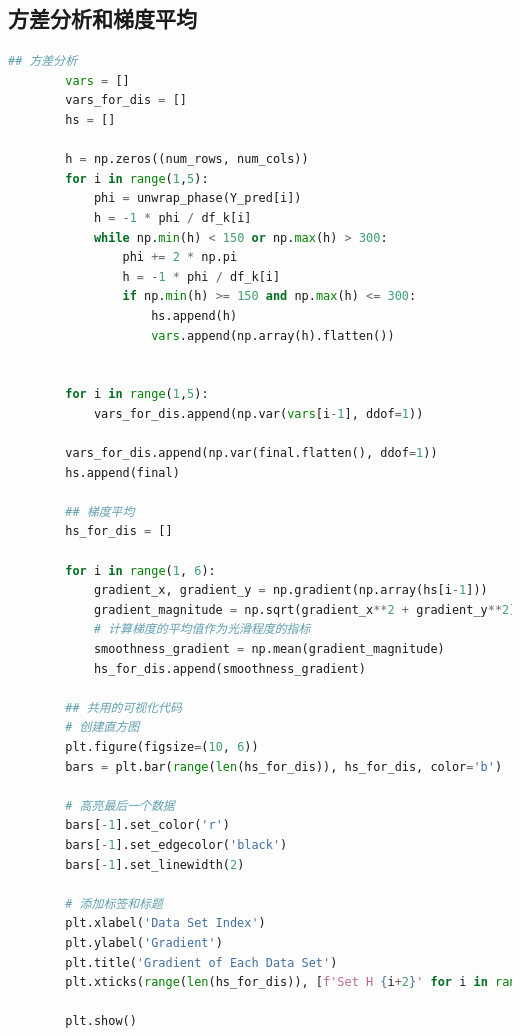 \documentclass[a4paper]{article}
\begin{document}
	\subsection{方差分析和梯度平均}
	\begin{lstlisting}[language=python,columns=fullflexible,frame=shadowbox]
		## 方差分析
		vars = []
		vars_for_dis = []
		hs = []
		
		h = np.zeros((num_rows, num_cols))
		for i in range(1,5):
			phi = unwrap_phase(Y_pred[i])
			h = -1 * phi / df_k[i]
			while np.min(h) < 150 or np.max(h) > 300:
				phi += 2 * np.pi
				h = -1 * phi / df_k[i]
				if np.min(h) >= 150 and np.max(h) <= 300:
					hs.append(h)
					vars.append(np.array(h).flatten())
			
					
		for i in range(1,5):
			vars_for_dis.append(np.var(vars[i-1], ddof=1))
		
		vars_for_dis.append(np.var(final.flatten(), ddof=1))
		hs.append(final)
			
		## 梯度平均
		hs_for_dis = []

		for i in range(1, 6):   
			gradient_x, gradient_y = np.gradient(np.array(hs[i-1]))
			gradient_magnitude = np.sqrt(gradient_x**2 + gradient_y**2)
			# 计算梯度的平均值作为光滑程度的指标
			smoothness_gradient = np.mean(gradient_magnitude)
			hs_for_dis.append(smoothness_gradient)
		
		## 共用的可视化代码
		# 创建直方图
		plt.figure(figsize=(10, 6))
		bars = plt.bar(range(len(hs_for_dis)), hs_for_dis, color='b')
		
		# 高亮最后一个数据
		bars[-1].set_color('r')
		bars[-1].set_edgecolor('black')
		bars[-1].set_linewidth(2)
		
		# 添加标签和标题
		plt.xlabel('Data Set Index')
		plt.ylabel('Gradient')
		plt.title('Gradient of Each Data Set')
		plt.xticks(range(len(hs_for_dis)), [f'Set H {i+2}' for i in range(len(hs_for_dis))])
		
		plt.show() 				
	\end{lstlisting}

	\subsection{}
	\begin{lstlisting}[language=python,columns=fullflexible,frame=shadowbox]

	\end{lstlisting}

	\subsection{}
	\begin{lstlisting}[language=python,columns=fullflexible,frame=shadowbox]

	\end{lstlisting}
	
\end{document}
